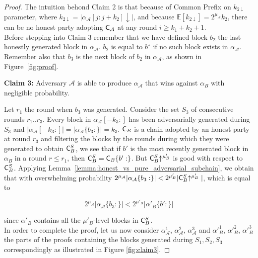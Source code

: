 \begin{proof}
	The intuition behond Claim 2 is that because of Common Prefix on $k_{2\downarrow}$ parameter, where
	$k_{2\downarrow} = \vert \alpha_\mathcal{A}[j:j+k_2]\downarrow\vert$, and because
	$\mathbb{E}[k_{2\downarrow}] = 2^{\mu_\mathcal{A}}k_2$, there can be no honest party adopting
	$\mathsf{C}_\mathcal{A}$ at any round $i \geq k_1 + k_2 + 1$. \\

Before stepping into Claim 3 remember that we have defined block $b_2$ the last honestly generated block in $\alpha_\mathcal{A}$. $b_2$ is equal to $b^\star$ if no such block exists in $\alpha_\mathcal{A}$. Remember also that $b_3$ is the next block of $b_2$ in $\alpha_\mathcal{A}$, as shown in Figure~\ref{fig:proof}.

	\noindent
	\textbf{Claim 3:} Adversary $\mathcal{A}$ is able to produce $\alpha_\mathcal{A}$ that wins against $\alpha_B$ with negligible probability.

	\noindent
	Let $r_1$ the round when $b_3$ was generated.
	Consider the set $S_3$ of consecutive rounds $r_1..r_3$. Every block in
	$\alpha_\mathcal{A}[-k_3:]$ has been adversarially generated during $S_3$ and $\vert
	\alpha_\mathcal{A}[-k_3:] \vert = \vert \alpha_\mathcal{A}\{b_3:\} \vert = k_3$. $\mathsf{C}_B$ is a chain
	adopted by an honest party at round $r_3$ and filtering the blocks by the rounds
	during which they were generated to obtain $\mathsf{C}_B^S$, we see that if $b'$ is the
	most recently generated block in $\alpha_B$ in a round $r \leq r_1$, then $\mathsf{C}_B^S =
	\mathsf{C}_B\{ b': \}$. But $\mathsf{C}_B^S \negthickspace\uparrow^{\mu'_B}$ is good with respect to $\mathsf{C}_B^S$.
	Applying Lemma~\ref{lemma:honest_vs_pure_adversarial_subchain}, we obtain that with overwhelming probability  $2^{\mu_\mathcal{A}} \vert
	\alpha_\mathcal{A}\{b_3:\} \vert < 2^{\mu'_B} \vert \mathsf{C}_B^S \negthickspace\uparrow^{\mu'_B} \vert$, which is
	equal to

	\begin{equation}
	2^{\mu_\mathcal{A}} \vert \alpha_\mathcal{A}\{b_3:\} \vert < 2^{\mu'_B} \vert \alpha'_B\{b':\} \vert
	\end{equation} 

	since $\alpha'_B$ contains all the $\mu'_B$-level blocks in $\mathsf{C}_B^S$. \\

	In order to complete the proof, let us now consider $\alpha_\mathcal{A}^{1}$,
	$\alpha_\mathcal{A}^{2}$, $\alpha_\mathcal{A}^{3}$ and $\alpha'^1_B$, $\alpha'^2_B$,
	$\alpha'^3_B$ the parts of the proofs containing the blocks generated during $S_1, S_2, S_3$ correspondingly as illustrated in Figure \ref{fig:claim3}.


\end{proof}
